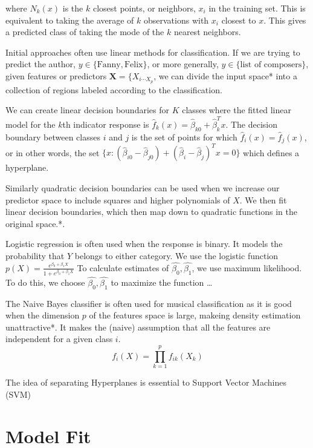 \documentclass[12pt,twoside]{reedthesis}
\theoremstyle{definition}
\theoremstyle{definition}
\theoremstyle{definition}
\theoremstyle{remark}
\begin{document}
where \(N_k(x)\) is the \(k\) closest points, or neighbors, \(x_i\) in
the training set. This is equivalent to taking the average of \(k\)
observations with \(x_i\) closest to \(x\). This gives a predicted class
of taking the mode of the \(k\) nearest neighbors.

Initial approaches often use linear methods for classification. If we
are trying to predict the author,
\(y \in \{\text{Fanny},\text{Felix}\}\), or more generally,
\(y \in \{\text{list of composers}\}\), given features or predictors
\(\textbf{X} = \{X_{i \cdots X_p}\), we can divide the input space* into
a collection of regions labeled according to the classification.

We can create linear decision boundaries for \(K\) classes where the
fitted linear model for the \(k\)th indicator response is
\(\hat{f}_k(x) = \hat{\beta}_{k0} + \hat{\beta}_{k}^Tx.\) The decision
boundary between classes \(i\) and \(j\) is the set of points for which
\(\hat{f}_i(x) = \hat{f}_j(x)\), or in other words, the set
\(\{x : (\hat{\beta}_{i0} - \hat{\beta}_{j0}) + (\hat{\beta}_{i} - \hat{\beta}_j)^Tx = 0 \}\)
which defines a hyperplane.

Similarly quadratic decision boundaries can be used when we increase our
predictor space to include squares and higher polynomials of \(X\). We
then fit linear decision boundaries, which then map down to quadratic
functions in the original space.*.

Logistic regression is often used when the response is binary. It models
the probability that \(Y\) belongs to either category. We use the
logistic function
\(p(X) = \frac{e^{\beta_0 + \beta_1X}}{1 + e^{\beta_0 + \beta_1X}}\) To
calculate estimates of \(\hat{\beta_0},\hat{\beta_1}\), we use maximum
likelihood. To do this, we choose \(\hat{\beta_0},\hat{\beta_1}\) to
maximize the function \ldots{}

The Naive Bayes classifier is often used for musical classification as
it is good when the dimension \(p\) of the features space is large,
makeing density estimation unattractive*. It makes the (naive)
assumption that all the features are independent for a given class
\(i\). \[f_i(X) = \prod_{k = 1}^p f_{ik}(X_k)\]

The idea of separating Hyperplanes is essential to Support Vector
Machines (SVM)

\chapter{Model Fit}\label{model-fit}
\end{document}
